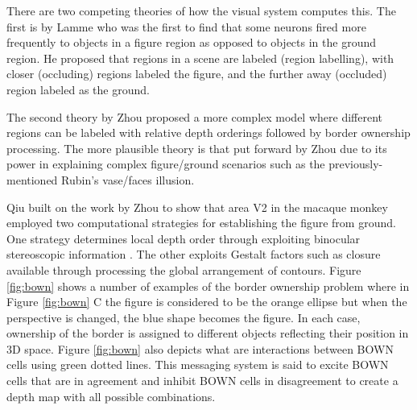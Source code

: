 There are two competing theories of how the visual system computes this. 
The first is by Lamme \cite{lamme1995neurophysiology} who was the first to find that some neurons fired more frequently to objects in a figure region as opposed to objects in the ground region. 
He proposed that regions in a scene are labeled (region labelling), with closer (occluding) regions labeled the figure, and the further away (occluded) region labeled as the ground.

The second theory by Zhou \etal \cite{zhou2000coding} proposed a more complex model where different regions can be labeled with relative depth orderings followed by border ownership processing. 
The more plausible theory is that put forward by Zhou \etal \cite{zhou2000coding} due to its power in explaining complex figure/ground scenarios such as the previously-mentioned Rubin's vase/faces illusion. 

Qiu \etal \cite{qiu2005figure} built on the work by Zhou \etal \cite{zhou2000coding} to show that area V2 in the macaque monkey employed two computational strategies for establishing the figure from ground. 
One strategy determines local depth order through exploiting binocular stereoscopic information \cite{qiu2005figure}. 
The other exploits Gestalt factors such as closure available through processing the global arrangement of contours\cite{qiu2005figure}. 
Figure \ref{fig:bown} shows a number of examples of the border ownership problem where in Figure \ref{fig:bown} C the figure is considered to be the orange ellipse but when the perspective is changed, the blue shape becomes the figure. 
In each case, ownership of the border is assigned to different objects reflecting their position in 3D space. 
Figure \ref{fig:bown} also depicts what are interactions between BOWN cells using green dotted lines. 
This messaging system is said to excite BOWN cells that are in agreement and inhibit BOWN cells in disagreement to create a depth map with all possible combinations. 

